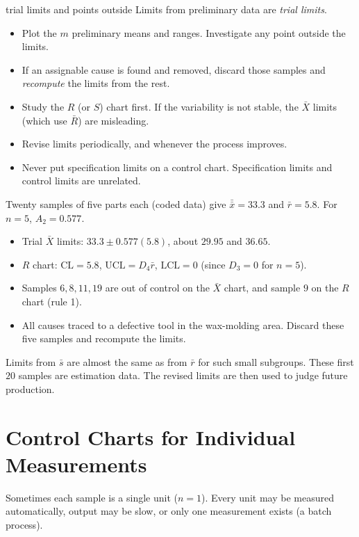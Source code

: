 \begin{pitfall}{trial limits and points outside}
Limits from preliminary data are \emph{trial limits}.
\begin{itemize}
  \item Plot the $m$ preliminary means and ranges. Investigate any point outside the limits.
  \item If an assignable cause is found and removed, discard those samples and \emph{recompute} the limits from the rest.
  \item Study the $R$ (or $S$) chart first. If the variability is not stable, the $\bar{X}$ limits (which use $\bar{R}$) are misleading.
  \item Revise limits periodically, and whenever the process improves.
  \item Never put specification limits on a control chart. Specification limits and control limits are unrelated.
\end{itemize}
\end{pitfall}

\begin{example}
Twenty samples of five parts each (coded data) give $\bar{\bar{x}}=33.3$ and $\bar{r}=5.8$. For $n=5$, $A_2=0.577$.
\begin{itemize}
  \item Trial $\bar{X}$ limits: $33.3\pm0.577(5.8)$, about $29.95$ and $36.65$.
  \item $R$ chart: $\mathrm{CL}=5.8$, $\mathrm{UCL}=D_4\bar{r}$, $\mathrm{LCL}=0$ (since $D_3=0$ for $n=5$).
  \item Samples $6,8,11,19$ are out of control on the $\bar{X}$ chart, and sample $9$ on the $R$ chart (rule 1).
  \item All causes traced to a defective tool in the wax-molding area. Discard these five samples and recompute the limits.
\end{itemize}
Limits from $\bar{s}$ are almost the same as from $\bar{r}$ for such small subgroups. These first $20$ samples are estimation data. The revised limits are then used to judge future production.
\end{example}

\section{Control Charts for Individual Measurements}

Sometimes each sample is a single unit ($n=1$). Every unit may be measured automatically, output may be slow, or only one measurement exists (a batch process).

